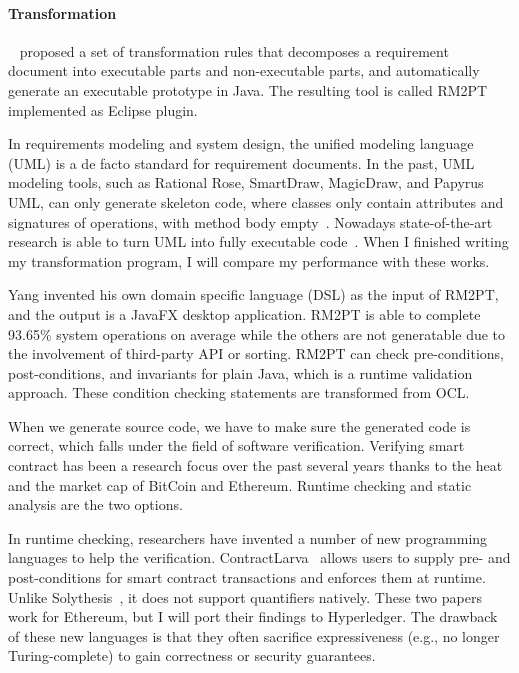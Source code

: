 \paragraph*{Transformation}
~\cite{yang2019automated} proposed a set of transformation rules that decomposes a requirement document into executable parts and non-executable parts, and automatically generate an executable prototype in Java.
The resulting tool is called RM2PT implemented as Eclipse plugin.

In requirements modeling and system design, the unified modeling language (UML) is a de facto standard for requirement documents.
In the past, UML modeling tools, such as Rational Rose, SmartDraw, MagicDraw, and Papyrus UML, can only generate skeleton code, where classes only contain attributes and signatures of operations, with method body empty~\cite{regep2000using}. Nowadays state-of-the-art research is able to turn UML into fully executable code~\cite{ciccozzi2019execution}.
When I finished writing my transformation program, I will compare my performance with these works.

Yang invented his own domain specific language (DSL) as the input of RM2PT, and the output is a JavaFX desktop application. RM2PT is able to complete 93.65\% system operations on average while the others are not generatable due to the involvement of third-party API or sorting.
RM2PT can check pre-conditions, post-conditions, and invariants for plain Java, which is a runtime validation approach.
These condition checking statements are transformed from OCL.

When we generate source code, we have to make sure the generated code is correct, which falls under the field of software verification.
Verifying smart contract has been a research focus over the past several years thanks to the heat and the market cap of BitCoin and Ethereum.
Runtime checking and static analysis are the two options.


In runtime checking, researchers have invented a number of new programming languages to help the verification.
ContractLarva~\cite{ellul2018runtime} allows users to supply pre- and post-conditions for smart contract transactions and enforces them at runtime. Unlike Solythesis~\cite{li2020securing}, it does not support quantifiers natively.
These two papers work for Ethereum, but I will port their findings to Hyperledger.
The drawback of these new languages is that they often sacrifice expressiveness (e.g., no longer Turing-complete) to gain correctness or security guarantees.

